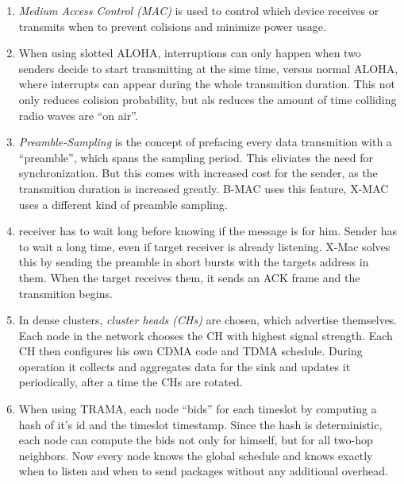 

\date{Monday, 31.05.2020}


    \maketitle
    \thispagestyle{fancy}

    \begin{enumerate}
        \item \emph{Medium Access Control (MAC)} is used to control which device receives or transmits when to prevent colisions and minimize power usage.
        \item When using slotted ALOHA, interruptions can only happen when two senders decide to start transmitting at the sime time, versus normal ALOHA, where interrupts can appear during the whole transmition duration. This not only reduces colision probability, but als reduces the amount of time colliding radio waves are ``on air''.
        \item \emph{Preamble-Sampling} is the concept of prefacing every data transmition with a ``preamble'', which spans the sampling period. This eliviates the need for synchronization. But this comes with increased cost for the sender, as the transmition duration is increased greatly. B-MAC uses this feature, X-MAC uses a different kind of preamble sampling.
        \item receiver has to wait long before knowing if the message is for him. Sender has to wait a long time, even if target receiver is already listening. X-Mac solves this by sending the preamble in short bursts with the targets address in them. When the target receives them, it sends an ACK frame and the transmition begins.
        \item In dense clusters, \emph{cluster heads (CHs)} are chosen, which advertise themselves. Each node in the network chooses the CH with highest signal strength. Each CH then configures his own CDMA code and TDMA schedule. During operation it collects and aggregates data for the sink and updates it periodically, after a time the CHs are rotated.
        \item When using TRAMA, each node ``bids'' for each timeslot by computing a hash of it's id and the timeslot timestamp. Since the hash is deterministic, each node can compute the bids not only for himself, but for all two-hop neighbors. Now every node knows the global schedule and knows exactly when to listen and when to send packages without any additional overhead.
    \end{enumerate}

